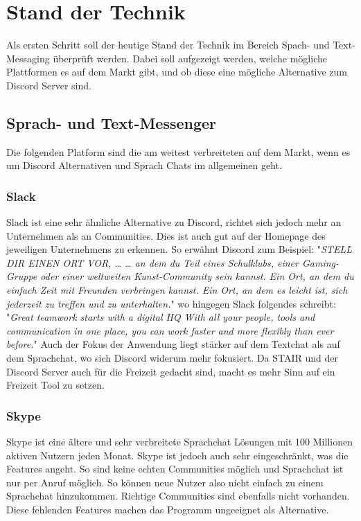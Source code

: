 \documentclass[a4paper, table]{article}
\begin{document}
\newpage
\section{Stand der Technik}
Als ersten Schritt soll der heutige Stand der Technik im Bereich Spach- und Text-Messaging überprüft werden.
Dabei soll aufgezeigt werden, welche mögliche Plattformen es auf dem Markt gibt, und ob diese eine mögliche Alternative zum Discord Server sind.

\subsection{Sprach- und Text-Messenger}
Die folgenden Platform sind die am weitest verbreiteten auf dem Markt, wenn es um Discord Alternativen und Sprach Chats im allgemeinen geht. \autocite{}
\subsubsection*{Slack}
Slack ist eine sehr ähnliche Alternative zu Discord, richtet sich jedoch mehr an Unternehmen als an Communities.
Dies ist auch gut auf der Homepage des jeweiligen Unternehmens zu erkennen.
So erwähnt Discord zum Beispiel: "\textit{STELL DIR EINEN ORT VOR, …
… an dem du Teil eines Schulklubs, einer Gaming-Gruppe oder einer weltweiten Kunst-Community sein kannst. Ein Ort, an dem du einfach Zeit mit Freunden verbringen kannst. Ein Ort, an dem es leicht ist, sich jederzeit zu treffen und zu unterhalten.}" 
wo hingegen Slack folgendes schreibt: "\textit{Great teamwork starts with a digital HQ
With all your people, tools and communication in one place, you can work faster and more flexibly than ever before.}" 
Auch der Fokus der Anwendung liegt stärker auf dem Textchat als auf dem Sprachchat, wo sich Discord widerum mehr fokusiert.
Da STAIR und der Discord Server auch für die Freizeit gedacht sind, macht es mehr Sinn auf ein Freizeit Tool zu setzen.

\subsubsection*{Skype}
Skype ist eine ältere und sehr verbreitete Sprachchat Lösungen mit 100 Millionen aktiven Nutzern jeden Monat.
Skype ist jedoch auch sehr eingeschränkt, was die Features angeht.
So sind keine echten Communities möglich und Sprachchat ist nur per Anruf möglich.
So können neue Nutzer also nicht einfach zu einem Sprachchat hinzukommen.
Richtige Communities sind ebenfalls nicht vorhanden.
Diese fehlenden Features machen das Programm ungeeignet als Alternative.
\end{document}
